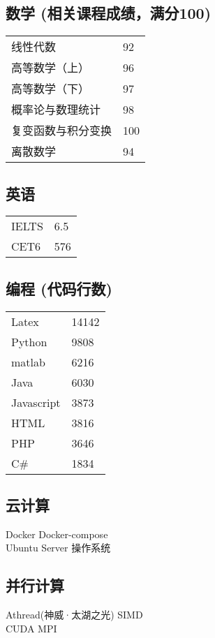 \documentclass[]{deedy-resume-openfont}
\begin{document}
\begin{minipage}[t]{0.25\textwidth}
	\subsection{数学 {\small (相关课程成绩，满分100)}}
	\begin{tabular}{ll}
		线性代数           & 92  \\
		高等数学（上）     & 96  \\
		高等数学（下）     & 97  \\
		概率论与数理统计   & 98  \\
		复变函数与积分变换 & 100 \\
		离散数学 &94\\
	\end{tabular}
	\sectionsep
	\subsection{英语}
	\begin{tabular}{ll}
		IELTS & 6.5 \\
		CET6  & 576 \\
	\end{tabular}
	\sectionsep
	\subsection{编程 {\small (代码行数)}}
	\begin{tabular}{ll}
		Latex      & 14142  \\
		Python     & 9808  \\
		matlab     & 6216  \\
		Java       & 6030  \\
		Javascript & 3873  \\
		HTML       & 3816  \\
		PHP        & 3646  \\
		C\#        & 1834  \\
	\end{tabular}
	\sectionsep
    
	\subsection{云计算}
	Docker \textbullet{} Docker-compose \\
	Ubuntu Server 操作系统\\
	\sectionsep

	\subsection{并行计算}
	Athread(神威·太湖之光) \textbullet{} SIMD \\
	CUDA \textbullet{} MPI \\
    \sectionsep
    

\end{minipage}
\end{document}
